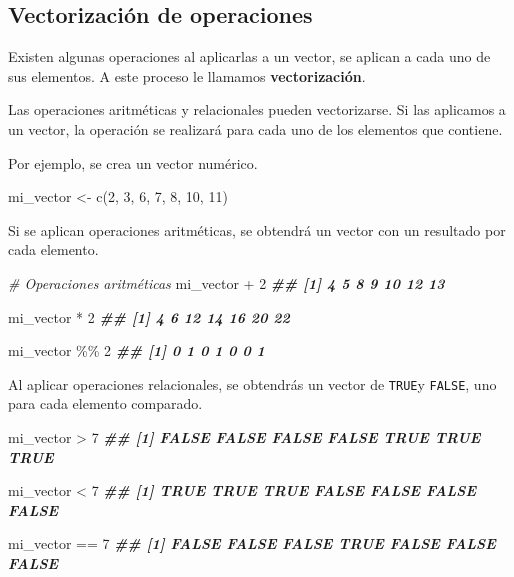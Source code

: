 \documentclass[
]{book}
\newenvironment{Shaded}{\begin{snugshade}}{\end{snugshade}}
\newcommand{\CommentTok}[1]{\textcolor[rgb]{0.56,0.35,0.01}{\textit{#1}}}
\newcommand{\DecValTok}[1]{\textcolor[rgb]{0.00,0.00,0.81}{#1}}
\newcommand{\DocumentationTok}[1]{\textcolor[rgb]{0.56,0.35,0.01}{\textbf{\textit{#1}}}}
\newcommand{\FunctionTok}[1]{\textcolor[rgb]{0.00,0.00,0.00}{#1}}
\newcommand{\NormalTok}[1]{#1}
\newcommand{\OtherTok}[1]{\textcolor[rgb]{0.56,0.35,0.01}{#1}}
\newcommand{\SpecialCharTok}[1]{\textcolor[rgb]{0.00,0.00,0.00}{#1}}
\begin{document}
\hypertarget{vectorizaciuxf3n-de-operaciones}{%
\subsection{Vectorización de operaciones}\label{vectorizaciuxf3n-de-operaciones}}

Existen algunas operaciones al aplicarlas a un vector, se aplican a cada uno de sus elementos. A este proceso le llamamos \textbf{vectorización}.

Las operaciones aritméticas y relacionales pueden vectorizarse. Si las aplicamos a un vector, la operación se realizará para cada uno de los elementos que contiene.

Por ejemplo, se crea un vector numérico.

\begin{Shaded}
\begin{Highlighting}[]
\NormalTok{mi\_vector }\OtherTok{\textless{}{-}} \FunctionTok{c}\NormalTok{(}\DecValTok{2}\NormalTok{, }\DecValTok{3}\NormalTok{, }\DecValTok{6}\NormalTok{, }\DecValTok{7}\NormalTok{, }\DecValTok{8}\NormalTok{, }\DecValTok{10}\NormalTok{, }\DecValTok{11}\NormalTok{)}
\end{Highlighting}
\end{Shaded}

Si se aplican operaciones aritméticas, se obtendrá un vector con un resultado por cada elemento.

\begin{Shaded}
\begin{Highlighting}[]
\CommentTok{\# Operaciones aritméticas}
\NormalTok{mi\_vector }\SpecialCharTok{+} \DecValTok{2}
\DocumentationTok{\#\# [1]  4  5  8  9 10 12 13}

\NormalTok{mi\_vector }\SpecialCharTok{*} \DecValTok{2}
\DocumentationTok{\#\# [1]  4  6 12 14 16 20 22}

\NormalTok{mi\_vector }\SpecialCharTok{\%\%} \DecValTok{2}
\DocumentationTok{\#\# [1] 0 1 0 1 0 0 1}
\end{Highlighting}
\end{Shaded}

Al aplicar operaciones relacionales, se obtendrás un vector de \texttt{TRUE}y \texttt{FALSE}, uno para cada elemento comparado.

\begin{Shaded}
\begin{Highlighting}[]
\NormalTok{mi\_vector }\SpecialCharTok{\textgreater{}} \DecValTok{7}
\DocumentationTok{\#\# [1] FALSE FALSE FALSE FALSE  TRUE  TRUE  TRUE}

\NormalTok{mi\_vector }\SpecialCharTok{\textless{}} \DecValTok{7}
\DocumentationTok{\#\# [1]  TRUE  TRUE  TRUE FALSE FALSE FALSE FALSE}

\NormalTok{mi\_vector }\SpecialCharTok{==} \DecValTok{7}
\DocumentationTok{\#\# [1] FALSE FALSE FALSE  TRUE FALSE FALSE FALSE}
\end{Highlighting}
\end{Shaded}
\end{document}
